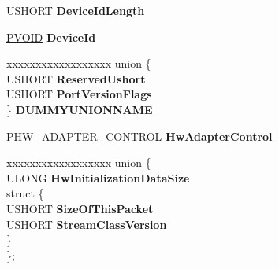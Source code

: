 \begin{DoxyCompactItemize}
U\+S\+H\+O\+RT {\bfseries Device\+Id\+Length}
\item 
\mbox{\label{struct___h_w___i_n_i_t_i_a_l_i_z_a_t_i_o_n___d_a_t_a_a0be8cd1e77f2b7a02e249cc4178cf1d1}} 
\hyperlink{interfacevoid}{P\+V\+O\+ID} {\bfseries Device\+Id}
\item 
\mbox{\label{struct___h_w___i_n_i_t_i_a_l_i_z_a_t_i_o_n___d_a_t_a_a69caeb3ee6aa5e549ea9c6ec0c38daec}} 
\begin{tabbing}
xx\=xx\=xx\=xx\=xx\=xx\=xx\=xx\=xx\=\kill
union \{\\
\>USHORT {\bfseries ReservedUshort}\\
\>USHORT {\bfseries PortVersionFlags}\\
\} {\bfseries DUMMYUNIONNAME}\\

\end{tabbing}\item 
\mbox{\label{struct___h_w___i_n_i_t_i_a_l_i_z_a_t_i_o_n___d_a_t_a_a439b56dd91898dacf2123a36560f6060}} 
P\+H\+W\+\_\+\+A\+D\+A\+P\+T\+E\+R\+\_\+\+C\+O\+N\+T\+R\+OL {\bfseries Hw\+Adapter\+Control}
\item 
\mbox{\label{struct___h_w___i_n_i_t_i_a_l_i_z_a_t_i_o_n___d_a_t_a_a9a431e6b8d5f43b761a810257efd8c22}} 
\begin{tabbing}
xx\=xx\=xx\=xx\=xx\=xx\=xx\=xx\=xx\=\kill
union \{\\
\>ULONG {\bfseries HwInitializationDataSize}\\
\mbox{\label{union___h_w___i_n_i_t_i_a_l_i_z_a_t_i_o_n___d_a_t_a_1_1_0D1844_ab6f3ba41aad490b0bbe7a362cae2c1ac}} 
\>struct \{\\
\>\>USHORT {\bfseries SizeOfThisPacket}\\
\>\>USHORT {\bfseries StreamClassVersion}\\
\>\} \\
\}; \\


\end{tabbing}
\end{DoxyCompactItemize}
